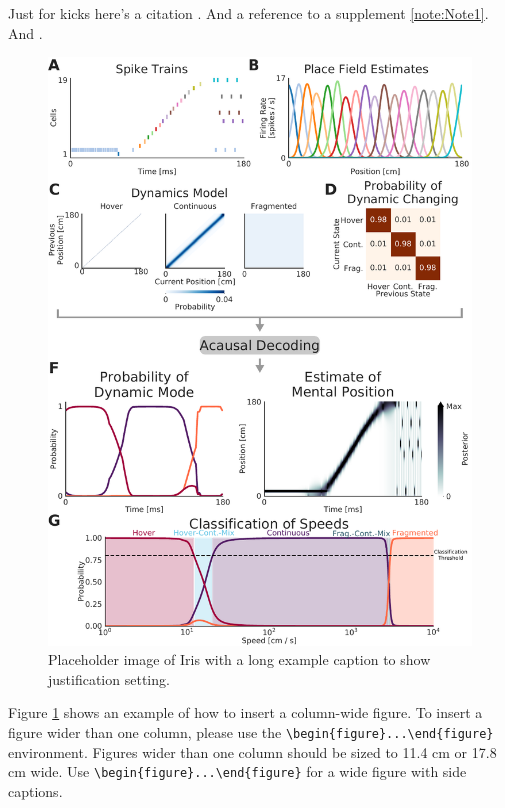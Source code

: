 \documentclass[times, twoside, watermark]{zHenriquesLab-StyleBioRxiv}
\begin{document}
Just for kicks here's a citation \cite{DavidsonHippocampalReplayExtended2009}. And a reference to a supplement \cref{note:Note1}. And .
\Blindtext

\begin{figure}%
\centering
\includegraphics[width=.8\linewidth]{figures/Figure1/Figure1_v3.pdf}
\caption{Placeholder image of Iris with a long example caption to show justification setting.}
\label{fig:computerNo}
\end{figure}

\Blindtext

Figure \ref{fig:computerNo} shows an example of how to insert a column-wide figure. To insert a figure wider than one column, please use the \verb|\begin{figure}...\end{figure}| environment. Figures wider than one column should be sized to 11.4 cm or 17.8 cm wide. Use \verb|\begin{figure}...\end{figure}| for a wide figure with side captions.
\end{document}
